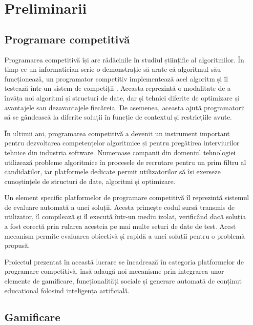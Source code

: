\chapter{Preliminarii}

\section{Programare competitivă}

Programarea competitivă își are rădăcinile în studiul științific al algoritmilor. În timp ce un informatician scrie o demonstrație să arate că algoritmul său funcționează, un programator competitiv implementează acel algoritm și îl testează într-un sistem de competiții \cite{laaksonen2017}. Aceasta reprezintă o modalitate de a învăța noi algoritmi și structuri de date, dar și tehnici diferite de optimizare și avantajele sau dezavantajele fiecăreia. De asemenea, aceasta ajută programatorii să se gândească la diferite soluții în funcție de contextul și restricțiile avute. 

În ultimii ani, programarea competitivă a devenit un instrument important pentru dezvoltarea competențelor algoritmice și pentru pregătirea interviurilor tehnice din industria software. Numeroase companii din domeniul tehnologiei utilizează probleme algoritmice în procesele de recrutare pentru un prim filtru al candidaților, iar platformele dedicate permit utilizatorilor să își exerseze cunoștințele de structuri de date, algoritmi și optimizare. 

Un element specific platformelor de programare competitivă îl reprezintă sistemul de evaluare automată a unei soluții. Acesta primește codul sursă transmis de utilizator, îl compilează și îl execută într-un mediu izolat, verificând dacă soluția a fost corectă prin rularea acesteia pe mai multe seturi de date de test. Acest mecanism permite evaluarea obiectivă și rapidă a unei soluții pentru o problemă propusă. 

Proiectul prezentat în această lucrare se încadrează în categoria platformelor de programare competitivă, însă adaugă noi mecanisme prin integrarea unor elemente de gamificare, funcționalități sociale și generare automată de conținut educațional folosind inteligența artificială.

\section{Gamificare}

